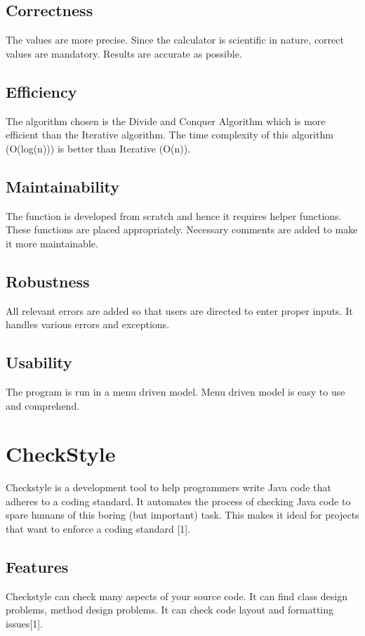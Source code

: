 \documentclass{article}
\begin{document}
\subsection{Correctness}
The values are more precise. Since the calculator is scientific in nature, correct values are mandatory. Results are accurate as possible. 
\subsection{Efficiency}
The algorithm chosen is the Divide and Conquer Algorithm which is more efficient than the Iterative algorithm. The time complexity of this algorithm (O(log(n))) is better than Iterative (O(n)).
\subsection{Maintainability}
The function is developed from scratch and hence it requires helper functions. These functions are placed appropriately. Necessary comments are added to make it more maintainable.
\subsection{Robustness}
All relevant errors are added so that users are directed to enter proper inputs. It handles various errors and exceptions.
\subsection{Usability}
The program is run in a menu driven model. Menu driven model is easy to use and comprehend. 
\section{CheckStyle}
Checkstyle is a development tool to help programmers write Java code that adheres to a coding standard. It automates the process of checking Java code to spare humans of this boring (but important) task. This makes it ideal for projects that want to enforce a coding standard [1].
\subsection{Features}
Checkstyle can check many aspects of your source code. It can find class design problems, method design problems. It can check code layout and formatting issues[1].
\end{document}
